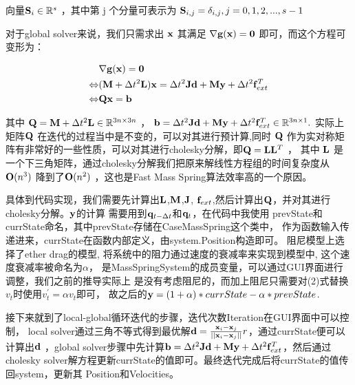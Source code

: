 \documentclass[]{ctexart}
\begin{document}
向量$ \bold{S}_i \in \mathbb{R}^{s}$ ，其中第 j 个分量可表示为 $\bold{S}_{i,j} = \delta_{i,j},j=0,1,2,...,s-1$ 

对于global solver来说，我们只需求出 $\bold{x}$ 其满足 $\nabla \bold{g}(\bold{x}) = \bold{0}$ 即可，而这个方程可变形为：

\begin{equation} \begin{aligned} 
	& \nabla\bold{g}(\bold{x}) = \bold{0}\\ \Leftrightarrow& (\bold{M}+\Delta t^2 \bold{L})\bold{x} 
	= \Delta t^2\bold{J}\bold{d} + \bold{M}\bold{y}+\Delta t^2\bold{f}_{ext}^{T} 
	\\ \Leftrightarrow& \bold{Q}\bold{x} = \bold{b} \end{aligned} \end{equation} 

其中 $\bold{Q} = \bold{M} + \Delta t^2\bold{L} \in \mathbb{R}^{3n \times 3n}$ ， 
$\bold{b} = \Delta t^2\bold{J}\bold{d} + \bold{M}\bold{y}+\Delta t^2\bold{f}_{ext}^{T} \in \mathbb{R}^{3n \times 1}. $
实际上矩阵$ \bold{Q}$ 在迭代的过程当中是不变的，可以对其进行预计算,同时 $\bold{Q} $
作为实对称矩阵有非常好的一些性质，可以对其进行cholesky分解，即$ \bold{Q} = \bold{L}\bold{L}^{T}$ ，
其中 $\bold{L}$ 是一个下三角矩阵，通过cholesky分解我们把原来解线性方程组的时间复杂度从 $\bold{O}(n^3) $
降到了$ \bold{O}(n^2)$ ，这也是Fast Mass Spring算法效率高的一个原因。

具体到代码实现，我们需要先计算出$\bold{L}$,$\bold{M}$,$\bold{J}$,
$\bold{f}_{ext}$,然后计算出$\bold{Q}$，并对其进行cholesky分解。$\bold{y}$的计算
需要用到$\bold{q}_{t-\Delta t}$和$\bold{q}_{t}$，在代码中我使用
prevState和currState命名，其中prevState存储在CaseMassSpring这个类中，
作为函数输入传递进来，currState在函数内部定义，由system.Position构造即可。
阻尼模型上选择了ether drag的模型,
将系统中的阻力通过速度的衰减率来实现到模型中,
这个速度衰减率被命名为$\alpha$，
是MassSpringSystem的成员变量，可以通过GUI界面进行调整，我们之前的推导实际上
是没有考虑阻尼的，而加上阻尼只需要对(2)式替换$v_t$时使用$v_t^{'}=\alpha v_t$即可，
故之后的$\bold{y}=(1+\alpha)*currState-\alpha*prevState $.

接下来就到了local-global循环迭代的步骤，迭代次数Iteration在GUI界面中可以控制，
local solver通过三角不等式得到最优解$\bold{d} = \frac{\bold{x}_i - 
\bold{x}_j}{||\bold{x}_i-\bold{x}_j||}r $，通过currState便可以计算出$\bold{d}$
，global solver步骤中先计算$\bold{b} = \Delta t^2\bold{J}\bold{d} +
 \bold{M}\bold{y}+\Delta t^2\bold{f}_{ext}^{T} 
 $，然后通过cholesky solver解方程更新currState的值即可。最终迭代完成后将currState的值传回system，更新其
 Position和Velocities。
\end{document}
